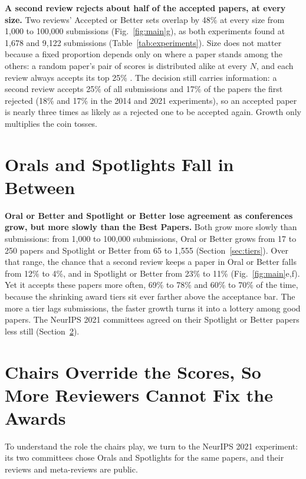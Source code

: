 \documentclass{article}
\begin{document}
\textbf{A second review rejects about half of the accepted papers, at every size.} Two reviews' Accepted or Better sets overlap by 48\% at every size from 1,000 to 100,000 submissions (Fig.~\ref{fig:main}g), as both experiments found at 1,678 and 9,122 submissions (Table~\ref{tab:experiments}). Size does not matter because a fixed proportion depends only on where a paper stands among the others: a random paper's pair of scores is distributed alike at every $N$, and each review always accepts its top 25\% \citep{taylor1939relationship,bartos2024selection}. The decision still carries information: a second review accepts 25\% of all submissions and 17\% of the papers the first rejected (18\% and 17\% in the 2014 and 2021 experiments), so an accepted paper is nearly three times as likely as a rejected one to be accepted again. Growth only multiplies the coin tosses.

\section{Orals and Spotlights Fall in Between}\label{sec:between}

\textbf{Oral or Better and Spotlight or Better lose agreement as conferences grow, but more slowly than the Best Papers.} Both grow more slowly than submissions: from 1,000 to 100,000 submissions, Oral or Better grows from 17 to 250 papers and Spotlight or Better from 65 to 1,555 (Section~\ref{sec:tiers}). Over that range, the chance that a second review keeps a paper in Oral or Better falls from 12\% to 4\%, and in Spotlight or Better from 23\% to 11\% (Fig.~\ref{fig:main}e,f). Yet it accepts these papers more often, 69\% to 78\% and 60\% to 70\% of the time, because the shrinking award tiers sit ever farther above the acceptance bar. The more a tier lags submissions, the faster growth turns it into a lottery among good papers. The NeurIPS 2021 committees agreed on their Spotlight or Better papers less still (Section~\ref{sec:award}).

\section{Chairs Override the Scores, So More Reviewers Cannot Fix the Awards}\label{sec:award}\label{sec:best}

To understand the role the chairs play, we turn to the NeurIPS 2021 experiment: its two committees chose Orals and Spotlights for the same papers, and their reviews and meta-reviews are public.
\end{document}
